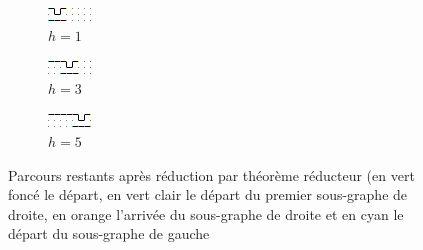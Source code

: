 \documentclass[twoside, a4paper, 12pt]{report}
\begin{document}
\begin{enumerate}
\begin{figure}
\begin{center}
\begin{subfigure}{0.55\textwidth}
   \includegraphics[width=1\linewidth, scale=5]{3_8_h=1.png}
   \caption{$h=1$}
   \label{fig:Ng1} 
\end{subfigure}

\begin{subfigure}{0.55\textwidth}
   \includegraphics[width=1\linewidth, scale=5]{3_8_h=3.png}
   \caption{$h=3$}
   \label{fig:Ng2}
\end{subfigure}

\begin{subfigure}{0.55\textwidth}
   \includegraphics[width=1\linewidth, scale=5]{3_8_h=5.png}
   \caption{$h=5$}
\end{subfigure}
\caption[Parcours restants après réduction par théorème réducteur]{Parcours restants après réduction par théorème réducteur (en vert foncé le départ, en vert clair le départ du premier sous-graphe de droite, en orange l'arrivée du sous-graphe de droite et en cyan le départ du sous-graphe de gauche}
\label{red_hvar_3}
\end{center}
\end{figure}


\end{enumerate}
\end{document}
